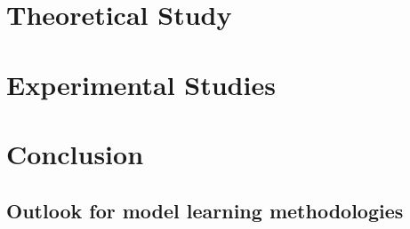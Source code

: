 \part{Theoretical Study}\label{part:theoretical_study}
%         
%         

\part{Experimental Studies}\label{part:experimental_study}
%         
%         
    
\part{Conclusion}\label{part:conclusion}
    \chapter{Outlook for model learning methodologies}\label{chapter:outlook}
        



